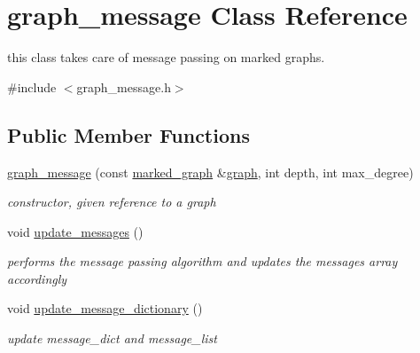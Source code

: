 \hypertarget{classgraph__message}{}\section{graph\+\_\+message Class Reference}
\label{classgraph__message}


this class takes care of message passing on marked graphs.  




{\ttfamily \#include $<$graph\+\_\+message.\+h$>$}

\subsection*{Public Member Functions}
\begin{DoxyCompactItemize}
\item 
\hyperlink{classgraph__message_a792e738b94a19f914e5495c416defe4d}{graph\+\_\+message} (const \hyperlink{classmarked__graph}{marked\+\_\+graph} \&\hyperlink{classgraph}{graph}, int depth, int max\+\_\+degree)
\begin{DoxyCompactList}\small\item\em constructor, given reference to a graph \end{DoxyCompactList}\item 
void \hyperlink{classgraph__message_a611832eb2767873fbff7b07c5790570d}{update\+\_\+messages} ()
\begin{DoxyCompactList}\small\item\em performs the message passing algorithm and updates the messages array accordingly \end{DoxyCompactList}\item 
void \hyperlink{classgraph__message_aede1ecdcf72bac693d357241eddb20b0}{update\+\_\+message\+\_\+dictionary} ()
\begin{DoxyCompactList}\small\item\em update message\+\_\+dict and message\+\_\+list \end{DoxyCompactList}\end{DoxyCompactItemize}
